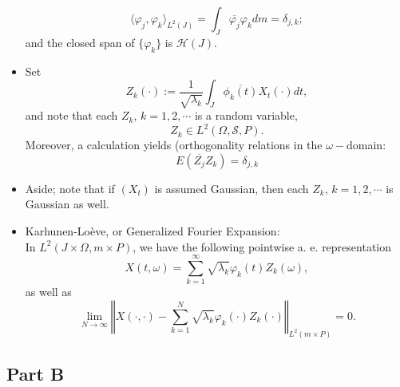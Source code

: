\documentclass{amsart}
\theoremstyle{definition}
\theoremstyle{remark}
\numberwithin{equation}{section}
\begin{document}
\begin{itemize}
\begin{equation}
        \label{eq5.5}
          \langle \varphi_{j}, \varphi_{k}\rangle_{L^{2}(J)} 
          = \int_{J}\overline{\varphi_{j}}{\varphi_{k}}dm = \delta_{j,k};
        \end{equation}
        and the closed span of $\{\varphi_{k}\}$ is $\mathcal{H}(J)$.
  \item Set 
        \begin{equation}
        
        \label{eq5.6}
          Z_{k}(\cdot):=\frac{1}{\sqrt{\lambda_{k}}} 
          \int_{J}\overline{\phi_{k}(t)}X_{t}(\cdot)dt,
        \end{equation}
        and note that each $Z_{k}$, $k=1,2, \cdots $ is a random variable,
        \[
          Z_{k} \in L^{2}(\Omega, \mathcal{S}, P).
        \]
        Moreover, a calculation yields (orthogonality relations in the 
        $\omega-$domain:
        \begin{equation}
        
        \label{eq5.7}
          E(\overline{Z_{j}}Z_{k})=\delta_{j,k}
        \end{equation}
  \item Aside; note that if $(X_{t})$ is assumed Gaussian, then each $Z_{k}$, 
        $k=1,2, \cdots$ is Gaussian as well.
  \item Karhunen-Lo\`{e}ve, or Generalized Fourier Expansion: \\
        In $L^{2}(J \times \Omega, m \times P)$, we have the following 
        pointwise a. e. representation
        \begin{equation}
        
        \label{eq5.8}
          X(t, \omega)=
          \sum_{k=1}^{\infty}\sqrt{\lambda_{k}}\varphi_{k}(t)Z_{k}(\omega), 
        \end{equation}
        as well as
        \begin{equation}
        
        \label{eq5.9}
          \lim_{N\to \infty} \left\Vert X(\cdot, \cdot) - 
          \sum_{k=1}^{N}\sqrt{\lambda_{k}}\varphi_{k}(\cdot)Z_{k}(\cdot)
          \right\Vert_{L^{2}(m \times P)} =0.
        \end{equation}

\end{itemize}

\subsection{Part B}
\label{partB}
\end{document}

